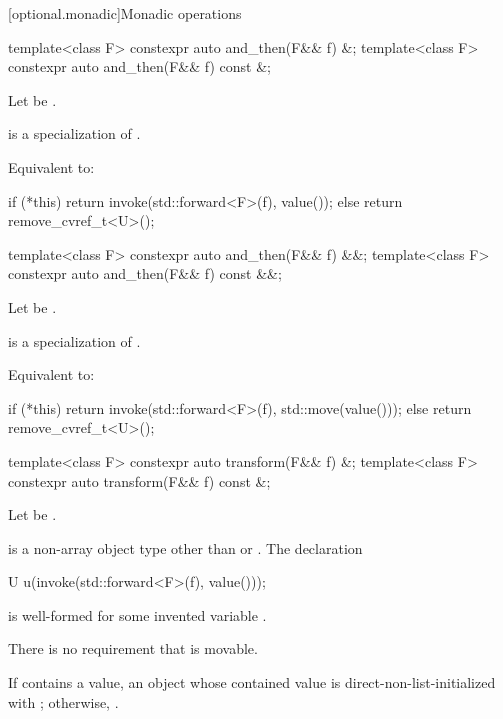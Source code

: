 [optional.monadic]{Monadic operations}

\begin{itemdecl}
template<class F> constexpr auto and_then(F&& f) &;
template<class F> constexpr auto and_then(F&& f) const &;
\end{itemdecl}

\begin{itemdescr}
\pnum
Let  be .

\pnum
\mandates
{} is a specialization of .

\pnum
\effects
Equivalent to:
\begin{codeblock}
if (*this) {
  return invoke(std::forward<F>(f), value());
} else {
  return remove_cvref_t<U>();
}
\end{codeblock}
\end{itemdescr}

\begin{itemdecl}
template<class F> constexpr auto and_then(F&& f) &&;
template<class F> constexpr auto and_then(F&& f) const &&;
\end{itemdecl}

\begin{itemdescr}
\pnum
Let  be .

\pnum
\mandates
{} is a specialization of .

\pnum
\effects
Equivalent to:
\begin{codeblock}
if (*this) {
  return invoke(std::forward<F>(f), std::move(value()));
} else {
  return remove_cvref_t<U>();
}
\end{codeblock}
\end{itemdescr}

\begin{itemdecl}
template<class F> constexpr auto transform(F&& f) &;
template<class F> constexpr auto transform(F&& f) const &;
\end{itemdecl}

\begin{itemdescr}
\pnum
Let  be .

\pnum
\mandates
{} is a non-array object type
other than  or .
The declaration
\begin{codeblock}
U u(invoke(std::forward<F>(f), value()));
\end{codeblock}
is well-formed for some invented variable .
\begin{note}
There is no requirement that  is movable.
\end{note}

\pnum
\returns
If  contains a value, an  object
whose contained value is direct-non-list-initialized with
;
otherwise, .
\end{itemdescr}

